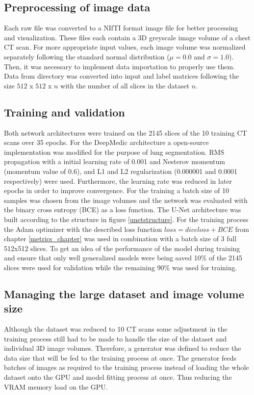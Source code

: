 \subsection{Preprocessing of image data}
Each raw file was converted to a NIfTI format \cite{nifti} image file for better processing and visualization. These files each contain a 3D greyscale image volume of a chest CT scan. For more appropriate input values, each image volume was normalized separately following the standard normal distribution ($\mu = 0.0$ and $\sigma = 1.0$).\newline
Then, it was necessary to implement data importation to properly use them. Data from directory was converted into input and label matrices following the size $512$ x $512$ x $n$ with the number of all slices in the dataset $n$.

\subsection{Training and validation}
Both network architectures were trained on the 2145 slices of the 10 training CT scans over 35 epochs.\newline
For the DeepMedic architecture a open-source implementation \cite{deepmediconline} was modified for the purpose of lung segmentation. RMS propagation with a initial learning rate of 0.001 and Nesterov momentum (momentum value of 0.6), and L1 and L2 regularization (0.000001 and 0.0001 respectively) were used. Furthermore, the learning rate was reduced in later epochs in order to improve convergence. For the training a batch size of 10 samples was chosen from the image volumes and the network was evaluated with the binary cross entropy (BCE) as a loss function.\newline
The U-Net architecture was built according to the structure in figure \ref{unetstructure}. For the training process the Adam optimizer with the described loss function $loss = dice loss + BCE$ from chapter \ref{metrics_chapter} was used in combination with a batch size of 3 full 512x512 slices. To get an idea of the performance of the model during training and ensure that only well generalized models were being saved 10\% of the 2145 slices were used for validation while the remaining 90\% was used for training.\newline

\subsection{Managing the large dataset and image volume size}
Although the dataset was reduced to 10 CT scans some adjustment in the training process still had to be made to handle the size of the dataset and individual 3D image volumes.\newline
Therefore, a generator was defined to reduce the data size that will be fed to the training process at once. The generator feeds batches of images as required to the training process instead of loading the whole dataset onto the GPU and model fitting process at once. Thus reducing the VRAM memory load on the GPU.

